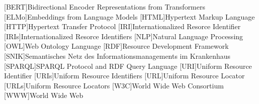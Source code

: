 \begin{acronym}
[BERT]{Bidirectional Encoder Representations from Transformers}
[ELMo]{Embeddings from Language Models}
[HTML]{Hypertext Markup Language}
[HTTP]{Hypertext Transfer Protocol}
[IRI]{Internationalized Resorce Identifier}
[IRIs]{Internationalized Resorce Identifiers}
[NLP]{Natural Language Processing}
[OWL]{Web Ontology Language}
[RDF]{Resource Development Framework}
[SNIK]{Semantisches Netz des Informationsmanagements im Krankenhaus}
[SPARQL]{SPARQL Protocol and RDF Query Language}
[URI]{Uniform Resource Identifier}
[URIs]{Uniform Resource Identifiers}
[URL]{Uniform Resource Locator}
[URLs]{Uniform Resource Locators}
[W3C]{World Wide Web Consortium}
[WWW]{World Wide Web}
\end{acronym}
